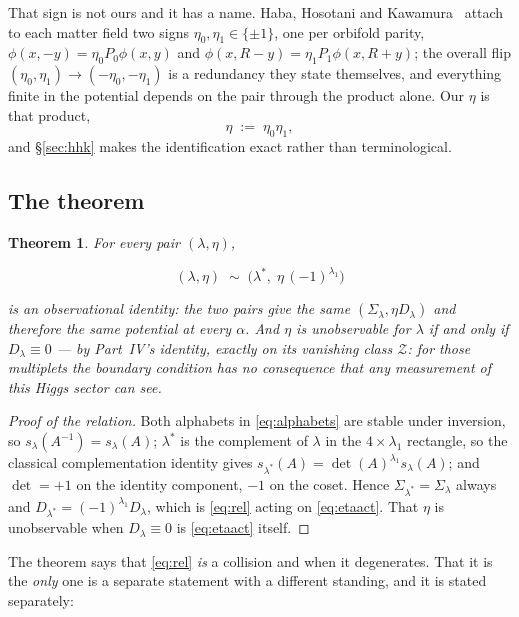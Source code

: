 \documentclass[11pt,a4paper]{article}
\newtheorem{theorem}{Theorem}
\newcommand{\Sig}{\Sigma_\lambda}
\newcommand{\Dl}{D_\lambda}
\newenvironment{keyeq}
  {\begin{center}\setlength{\fboxsep}{9pt}\setlength{\fboxrule}{0.8pt}%
   \begin{lrbox}{\keyeqbox}\begin{minipage}{0.88\textwidth}}
  {\end{minipage}\end{lrbox}%
   \fcolorbox{hdrblue!55}{hdrblue!6}{\usebox{\keyeqbox}}\end{center}}
\begin{document}
That sign is not ours and it has a name. Haba, Hosotani and Kawamura~\cite{HHK} attach to each
matter field two signs $\eta_0,\eta_1\in\{\pm1\}$, one per orbifold parity,
$\phi(x,-y)=\eta_0P_0\phi(x,y)$ and $\phi(x,R-y)=\eta_1P_1\phi(x,R+y)$; the overall flip
$(\eta_0,\eta_1)\to(-\eta_0,-\eta_1)$ is a redundancy they state themselves, and everything finite in
the potential depends on the pair through the product alone. Our $\eta$ is that product,
\begin{equation}\label{eq:etaname}
\eta \;:=\; \eta_0\eta_1 ,
\end{equation}
and \S\ref{sec:hhk} makes the identification exact rather than terminological.

\subsection*{The theorem}

\begin{theorem}\label{thm:main}
For every pair $(\lambda,\eta)$,
\begin{keyeq}
\begin{equation}\label{eq:rel}
(\lambda,\eta)\;\sim\;\big(\lambda^*,\;\eta\,(-1)^{\lambda_1}\big)
\end{equation}
\end{keyeq}
is an observational identity: the two pairs give the same $(\Sig,\eta\Dl)$ and therefore the same
potential at every $\alpha$. And $\eta$ is unobservable for $\lambda$ \emph{if and only if}
$\Dl\equiv0$ --- by Part~IV's identity, exactly on its vanishing class $\mathcal Z$: for those
multiplets the boundary condition has no consequence that any measurement of this Higgs sector can
see.
\end{theorem}

\begin{proof}[Proof of the relation]
Both alphabets in \eqref{eq:alphabets} are stable under inversion, so $s_\lambda(A^{-1})=s_\lambda(A)$;
$\lambda^*$ is the complement of $\lambda$ in the $4\times\lambda_1$ rectangle, so the classical
complementation identity gives $s_{\lambda^*}(A)=\det(A)^{\lambda_1}s_\lambda(A)$; and $\det=+1$ on
the identity component, $-1$ on the coset. Hence $\Sigma_{\lambda^*}=\Sig$ always and
$D_{\lambda^*}=(-1)^{\lambda_1}\Dl$, which is \eqref{eq:rel} acting on \eqref{eq:etaact}. That $\eta$
is unobservable when $\Dl\equiv0$ is \eqref{eq:etaact} itself.
\end{proof}

The theorem says that \eqref{eq:rel} \emph{is} a collision and when it degenerates. That it is the
\emph{only} one is a separate statement with a different standing, and it is stated separately:
\end{document}
